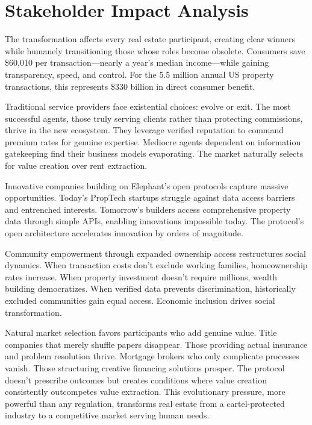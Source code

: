 \section{Stakeholder Impact Analysis}

The transformation affects every real estate participant, creating clear winners while humanely transitioning those whose roles become obsolete. Consumers save \$60,010 per transaction—nearly a year's median income—while gaining transparency, speed, and control. For the 5.5 million annual US property transactions, this represents \$330 billion in direct consumer benefit.

Traditional service providers face existential choices: evolve or exit. The most successful agents, those truly serving clients rather than protecting commissions, thrive in the new ecosystem. They leverage verified reputation to command premium rates for genuine expertise. Mediocre agents dependent on information gatekeeping find their business models evaporating. The market naturally selects for value creation over rent extraction.

Innovative companies building on Elephant's open protocols capture massive opportunities. Today's PropTech startups struggle against data access barriers and entrenched interests. Tomorrow's builders access comprehensive property data through simple APIs, enabling innovations impossible today. The protocol's open architecture accelerates innovation by orders of magnitude.

Community empowerment through expanded ownership access restructures social dynamics. When transaction costs don't exclude working families, homeownership rates increase. When property investment doesn't require millions, wealth building democratizes. When verified data prevents discrimination, historically excluded communities gain equal access. Economic inclusion drives social transformation.

Natural market selection favors participants who add genuine value. Title companies that merely shuffle papers disappear. Those providing actual insurance and problem resolution thrive. Mortgage brokers who only complicate processes vanish. Those structuring creative financing solutions prosper. The protocol doesn't prescribe outcomes but creates conditions where value creation consistently outcompetes value extraction. This evolutionary pressure, more powerful than any regulation, transforms real estate from a cartel-protected industry to a competitive market serving human needs.